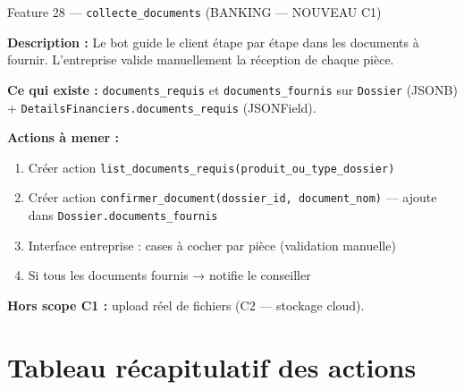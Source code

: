 \documentclass[11pt,a4paper]{article}
\newcommand{\slug}[1]{\texttt{\color{AGTDark}#1}}
\begin{document}
\bigskip

\begin{bankingfeaturebox}{Feature 28 — \slug{collecte\_documents} (BANKING — NOUVEAU C1)}

\textbf{Description :} Le bot guide le client étape par étape dans les documents à
fournir. L'entreprise valide manuellement la réception de chaque pièce.

\textbf{Ce qui existe :} \slug{documents\_requis} et \slug{documents\_fournis} sur
\slug{Dossier} (JSONB) + \slug{DetailsFinanciers.documents\_requis} (JSONField).

\textbf{Actions à mener :}
\begin{enumerate}
  \item Créer action \slug{list\_documents\_requis(produit\_ou\_type\_dossier)}
  \item Créer action \slug{confirmer\_document(dossier\_id, document\_nom)} —
        ajoute dans \slug{Dossier.documents\_fournis}
  \item Interface entreprise : cases à cocher par pièce (validation manuelle)
  \item Si tous les documents fournis → notifie le conseiller
\end{enumerate}

\textbf{Hors scope C1 :} upload réel de fichiers (C2 — stockage cloud).

\end{bankingfeaturebox}

\section{Tableau récapitulatif des actions}
\end{document}
